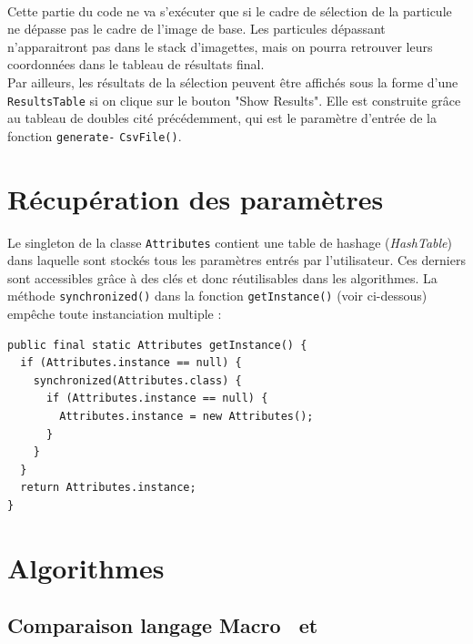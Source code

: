 \paragraph*{}
Cette partie du code ne va s'exécuter que si le cadre de sélection de la particule ne dépasse pas le cadre de l'image de base. Les particules dépassant n'apparaitront pas dans le stack d'imagettes, mais on pourra retrouver leurs coordonnées dans le tableau de résultats final. \\

Par ailleurs, les résultats de la sélection peuvent être affichés sous la forme d'une \texttt{ResultsTable} si on clique sur le bouton "Show Results". Elle est construite grâce au tableau de doubles cité précédemment, qui est le paramètre d'entrée de la fonction \texttt{generate-} \texttt{CsvFile()}. 

\section{Récupération des paramètres}

Le singleton de la classe \texttt{Attributes} contient une table de hashage (\emph{HashTable}) dans laquelle sont stockés tous les paramètres entrés par l'utilisateur. Ces derniers sont accessibles grâce à des clés et donc réutilisables dans les algorithmes. La méthode  \texttt{synchronized()} dans la fonction \texttt{getInstance()} (voir ci-dessous) empêche toute instanciation multiple :

\begin{center}
\begin{fmpage}{11cm}
\begin{small}
\begin{lstlisting}
public final static Attributes getInstance() {
  if (Attributes.instance == null) {
    synchronized(Attributes.class) {
      if (Attributes.instance == null) {
        Attributes.instance = new Attributes();
      }
    }
  }
  return Attributes.instance;
}
\end{lstlisting}
\end{small}	
\end{fmpage}
\end{center}

\pagebreak

\section{Algorithmes}

\subsection{Comparaison langage Macro \imj ~et \java}

